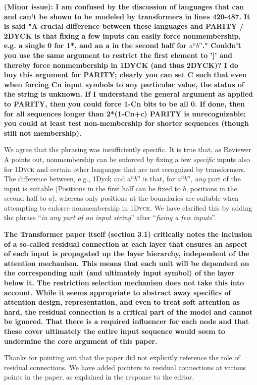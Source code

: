 \documentclass[11pt,a4paper]{article}
\newcommand\response[1]{{\color{blue}#1}}
\newcommand\newtext[1]{``\textit{#1}''}
\newcommand\original[1]{\textbf{#1}}
\begin{document}
\original{(Minor issue): I am confused by the discussion of languages that can and
can't be
shown to be modeled by transformers in lines 420-487. It is said "A
crucial difference between these languages and PARITY / 2DYCK is that
fixing a few inputs can easily force nonmembership, e.g. a single 0
for 1*, and an a in the second half for $a^n b^n$." Couldn't you use the
same argument to restrict the first element to ']' and thereby force
nonmembership in 1DYCK (and thus 2DYCK)? I do buy this
argument for PARITY; clearly you can set C such that even when forcing
Cn input symbols to any particular value, the status of the string is
unknown. If I understand the general argument as applied to PARITY,
then you could force 1-Cn bits to be all 0. If done, then for all
sequences longer than 2*(1-Cn+c) PARITY is unrecognizable; you could
at least test non-membership for shorter sequences (though still not
membership).}

\response{We agree that the phrasing was insufficiently specific. It is true that, as Reviewer A points out, nonmembership can be enforced by fixing a few \emph{specific} inputs also for \textsc{1Dyck} and certain other languages that are not recognized by transformers. The difference between, e.g., 1Dyck and $a^nb^n$ is that, for $a^nb^n$, \emph{any} part of the input is suitable (Positions in the first half can be fixed to $b$, positions in the second half to $a$), whereas only positions at the boundaries are suitable when attempting to enforce nonmembership in \textsc{1Dyck}. We have clarified this by adding the phrase \newtext{in any part of an input string} after \newtext{fixing a few inputs}.}


\original{The Transformer paper itself (section 3.1) critically notes the
inclusion of a so-called residual connection
at each layer that ensures an aspect of each input is propagated up the
layer
hierarchy, independent of the attention mechanism. This means that
each unit will be dependent on the corresponding unit (and ultimately
input symbol) of the layer below it. The restriction selection
mechanism does not take this into account. While it seems appropriate to
abstract away specifics of attention design, representation, and even
to treat soft attention as hard, the residual connection is a critical part
of the model and cannot be ignored. That there is a required
influencer for each node and that these cover ultimately the entire
input sequence would seem to undermine the core argument of this paper.}

\response{Thanks for pointing out that the paper did not explicitly reference the role of residual connections. We have added pointers to residual connections at various points in the paper, as explained in the response to the editor.}
\end{document}
